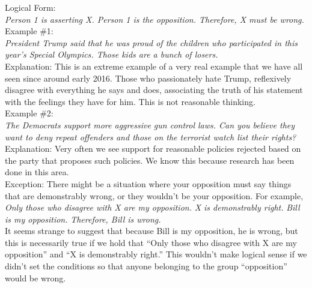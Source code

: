 \documentclass[a4paper,12pt,single,pdftex]{scrbook}
\begin{document}
    
      Logical Form:
    \\

    
      {\em Person 1 is asserting X. \newline
Person 1 is the opposition. \newline
Therefore, X must be wrong.}
    \\

    
      Example \#1:
    \\

    
      {\em President Trump said that he was proud of the children who participated in this year's Special Olympics. Those kids are a bunch of losers.}
    \\

    
      Explanation: This is an extreme example of a very real example that we have all seen since around early 2016. Those who passionately hate Trump, reflexively disagree with everything he says and does, associating the truth of his statement with the feelings they have for him. This is not reasonable thinking.
    \\

    
      Example \#2:
    \\

    
      {\em The Democrats support more aggressive gun control laws. Can you believe they want to deny repeat offenders and those on the terrorist watch list their rights?}
    \\

    
      Explanation: Very often we see support for reasonable policies rejected based on the party that proposes such policies. We know this because research has been done in this area.
    \\

    
      Exception: There might be a situation where your opposition must say things that are demonstrably wrong, or they wouldn’t be your opposition. For example,
    \\

    
      {\em Only those who disagree with X are my opposition.} \newline
{\em X is demonstrably right.} \newline
{\em Bill is my opposition.} \newline
{\em Therefore, Bill is wrong.}
    \\

    
      It seems strange to suggest that because Bill is my opposition, he is wrong, but this is necessarily true if we hold that “Only those who disagree with X are my opposition” and “X is demonstrably right.” This wouldn’t make logical sense if we didn’t set the conditions so that anyone belonging to the group “opposition” would be wrong.
    \\
\end{document}
